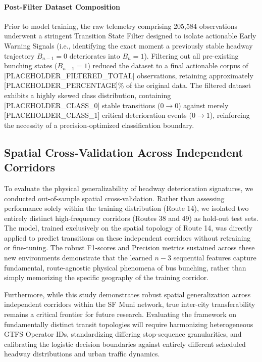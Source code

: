 \paragraph{Post-Filter Dataset Composition}
Prior to model training, the raw telemetry comprising 205,584 observations underwent a stringent Transition State Filter designed to isolate actionable Early Warning Signals (i.e., identifying the exact moment a previously stable headway trajectory $B_{n-1} = 0$ deteriorates into $B_n = 1$). Filtering out all pre-existing bunching states ($B_{n-1} = 1$) reduced the dataset to a final actionable corpus of [PLACEHOLDER_FILTERED_TOTAL] observations, retaining approximately [PLACEHOLDER_PERCENTAGE]\% of the original data. The filtered dataset exhibits a highly skewed class distribution, containing [PLACEHOLDER_CLASS_0] stable transitions ($0 \rightarrow 0$) against merely [PLACEHOLDER_CLASS_1] critical deterioration events ($0 \rightarrow 1$), reinforcing the necessity of a precision-optimized classification boundary.

\subsection{Spatial Cross-Validation Across Independent Corridors}
To evaluate the physical generalizability of headway deterioration signatures, we conducted out-of-sample spatial cross-validation. Rather than assessing performance solely within the training distribution (Route 14), we isolated two entirely distinct high-frequency corridors (Routes 38 and 49) as hold-out test sets. The model, trained exclusively on the spatial topology of Route 14, was directly applied to predict transitions on these independent corridors without retraining or fine-tuning. The robust F1-scores and Precision metrics sustained across these new environments demonstrate that the learned $n-3$ sequential features capture fundamental, route-agnostic physical phenomena of bus bunching, rather than simply memorizing the specific geography of the training corridor.

Furthermore, while this study demonstrates robust spatial generalization across independent corridors within the SF Muni network, true inter-city transferability remains a critical frontier for future research. Evaluating the framework on fundamentally distinct transit topologies will require harmonizing heterogeneous GTFS Operator IDs, standardizing differing stop-sequence granularities, and calibrating the logistic decision boundaries against entirely different scheduled headway distributions and urban traffic dynamics.
